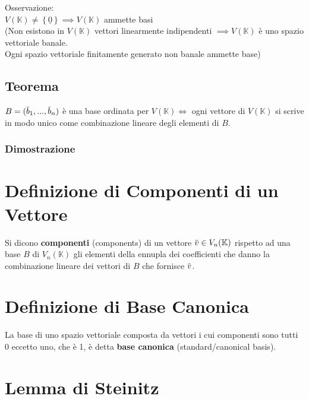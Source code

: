 \documentclass[a4paper, twoside, italian, 11pt]{book}
\newcommand{\braces}[1] {\left \{ #1 \right \}}
\newcommand{\overbar}[1] {\mkern 1.5mu\overline{\mkern-1.5mu#1\mkern-1.5mu}\mkern 1.5mu}
\newcommand{\K}{\mathbb K}
\begin{document}
\noindent
Osservazione: \\

$V(\K) \neq \braces{\underline 0} \implies V(\K)$ ammette basi \\

\noindent
(Non esistono in $V(\K)$ vettori linearmente indipendenti $\implies V(\K)$ è uno spazio vettoriale banale. \\
Ogni spazio vettoriale finitamente generato non banale ammette base)


\subsection{Teorema}

$B = (\overbar b_1, ..., \overbar b_n)$ è una base ordinata per $V(\K) \iff$ ogni vettore di $V(\K)$ si scrive in modo unico come combinazione lineare degli elementi di $B$.


\subsubsection{Dimostrazione}




\section{Definizione di Componenti di un Vettore}

Si dicono \textbf{componenti} (components) di un vettore $\overbar v \in V_n(\K)$ rispetto ad una base $B$ di $V_n(\K)$ gli elementi della ennupla dei coefficienti che danno la combinazione lineare dei vettori di $B$ che fornisce $\overbar v$.



\section{Definizione di Base Canonica}

La base di uno spazio vettoriale composta da vettori i cui componenti sono tutti 0 eccetto uno, che è 1, è detta \textbf{base canonica} (standard/canonical basis).



\section{Lemma di Steinitz}

\end{document}
